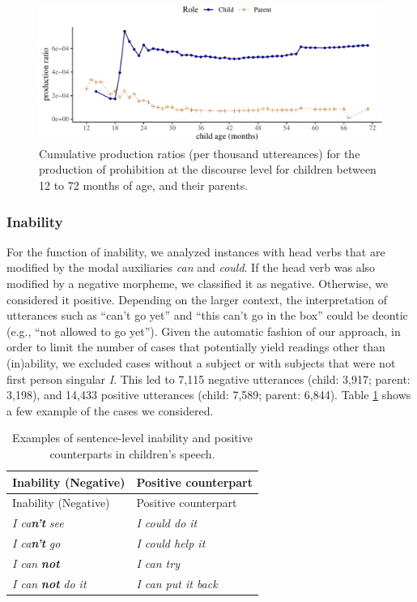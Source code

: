\documentclass[
  man,floatsintext]{apa6}
\begin{document}
\begin{figure}[H]

{\centering \includegraphics{neg_construction_article_files/figure-latex/prohibitiondiscourse-1} 

}

\caption{Cumulative production ratios (per thousand uttereances) for the production of prohibition at the discourse level for children between 12 to 72 months of age, and their parents.}\label{fig:prohibitiondiscourse}
\end{figure}

\hypertarget{inability}{%
\subsubsection{Inability}\label{inability}}

For the function of inability, we analyzed instances with head verbs that are modified by the modal auxiliaries \emph{can} and \emph{could}. If the head verb was also modified by a negative morpheme, we classified it as negative. Otherwise, we considered it positive. Depending on the larger context, the interpretation of utterances such as ``can't go yet'' and ``this can't go in the box'' could be deontic (e.g., ``not allowed to go yet''). Given the automatic fashion of our approach, in order to limit the number of cases that potentially yield readings other than (in)ability, we excluded cases without a subject or with subjects that were not first person singular \emph{I}. This led to 7,115 negative utterances (child: 3,917; parent: 3,198), and 14,433 positive utterances (child: 7,589; parent: 6,844). Table \ref{tab:inab} shows a few example of the cases we considered.

\begin{longtable}[]{@{}ll@{}}
\caption{\label{tab:inab} Examples of sentence-level inability and positive counterparts in children's speech.}\tabularnewline
\toprule\noalign{}
Inability (Negative) & Positive counterpart \\
\midrule\noalign{}
\endfirsthead
\toprule\noalign{}
Inability (Negative) & Positive counterpart \\
\midrule\noalign{}
\endhead
\bottomrule\noalign{}
\endlastfoot
\emph{I ca\textbf{n't}} \emph{see} & \emph{I could do it} \\
\emph{I ca\textbf{n't}} \emph{go} & \emph{I could help it} \\
\emph{I can} \textbf{\emph{not}} & \emph{I can try} \\
\emph{I can} \textbf{\emph{not}} \emph{do it} & \emph{I can put it back} \\
\end{longtable}
\end{document}
